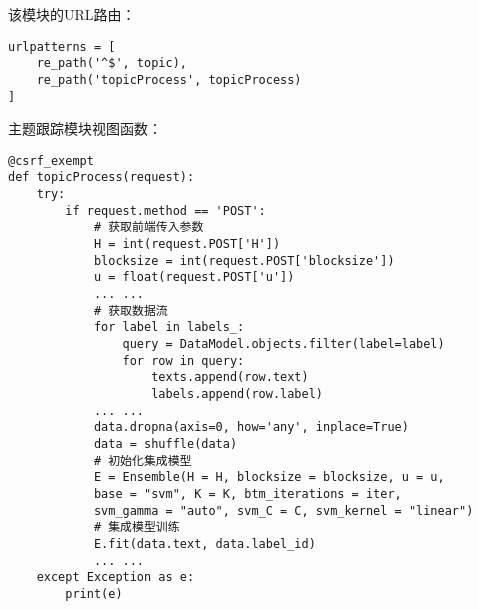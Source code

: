 该模块的URL路由：
\begin{verbatim}
urlpatterns = [
    re_path('^$', topic),
    re_path('topicProcess', topicProcess)
]
\end{verbatim}

主题跟踪模块视图函数：
\begin{verbatim}
@csrf_exempt
def topicProcess(request):
    try:
        if request.method == 'POST':
            # 获取前端传入参数
            H = int(request.POST['H'])
            blocksize = int(request.POST['blocksize'])
            u = float(request.POST['u'])
            ... ...
            # 获取数据流
            for label in labels_:
                query = DataModel.objects.filter(label=label)
                for row in query:
                    texts.append(row.text)
                    labels.append(row.label)
            ... ...
            data.dropna(axis=0, how='any', inplace=True)
            data = shuffle(data)
            # 初始化集成模型
            E = Ensemble(H = H, blocksize = blocksize, u = u,
            base = "svm", K = K, btm_iterations = iter,
            svm_gamma = "auto", svm_C = C, svm_kernel = "linear")
            # 集成模型训练              
            E.fit(data.text, data.label_id)
            ... ...
    except Exception as e:
        print(e)
\end{verbatim}




    

    
